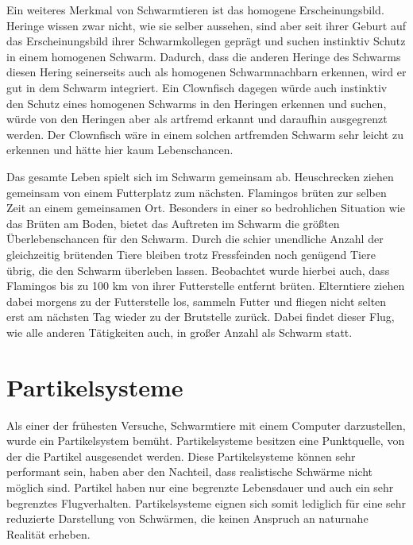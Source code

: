 \documentclass[draft=false
              ,paper=a4
              ,twoside=false
              ,fontsize=11pt
              ,headsepline
              ,BCOR10mm
              ,DIV11
              ,bibtotoc
              ,liststotoc
              ]{scrbook}
\begin{document}
Ein weiteres Merkmal von Schwarmtieren ist das homogene Erscheinungsbild. Heringe wissen zwar nicht, wie sie selber aussehen, sind aber seit ihrer Geburt auf das Erscheinungsbild ihrer Schwarmkollegen geprägt und suchen instinktiv Schutz in einem homogenen Schwarm. Dadurch, dass die anderen Heringe des Schwarms diesen Hering seinerseits auch als homogenen Schwarmnachbarn erkennen, wird er gut in dem Schwarm integriert. Ein Clownfisch dagegen würde auch instinktiv den Schutz eines homogenen Schwarms in den Heringen erkennen und suchen, würde von den Heringen aber als artfremd erkannt und daraufhin ausgegrenzt werden. Der Clownfisch wäre in einem solchen artfremden Schwarm sehr leicht zu erkennen und hätte hier kaum Lebenschancen.

Das gesamte Leben spielt sich im Schwarm gemeinsam ab. Heuschrecken ziehen gemeinsam von einem Futterplatz zum nächsten. Flamingos brüten zur selben Zeit an einem gemeinsamen Ort. Besonders in einer so bedrohlichen Situation wie das Brüten am Boden, bietet das Auftreten im Schwarm die größten Überlebenschancen für den Schwarm. Durch die schier unendliche Anzahl der gleichzeitig brütenden Tiere bleiben trotz Fressfeinden noch genügend Tiere übrig, die den Schwarm überleben lassen. Beobachtet wurde hierbei auch, dass Flamingos bis zu 100 km von ihrer Futterstelle entfernt brüten. Elterntiere ziehen dabei morgens zu der Futterstelle los, sammeln Futter und fliegen nicht selten erst am nächsten Tag wieder zu der Brutstelle zurück. Dabei findet dieser Flug, wie alle anderen Tätigkeiten auch, in großer Anzahl als Schwarm statt.
\section{Partikelsysteme}
Als einer der frühesten Versuche, Schwarmtiere mit einem Computer darzustellen, wurde ein Partikelsystem bemüht. Partikelsysteme besitzen eine Punktquelle, von der die Partikel ausgesendet werden. Diese Partikelsysteme können sehr performant sein, haben aber den Nachteil, dass realistische Schwärme nicht möglich sind. Partikel haben nur eine begrenzte Lebensdauer und auch ein sehr begrenztes Flugverhalten. Partikelsysteme eignen sich somit lediglich für eine sehr reduzierte Darstellung von Schwärmen, die keinen Anspruch an naturnahe Realität erheben.
\end{document}

